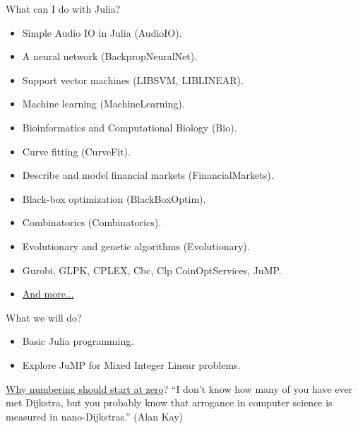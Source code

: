 \documentclass{beamer}
\begin{document}
\begin{frame}{What can I do with Julia?}
  \begin{itemize}\footnotesize
  \item[] Simple Audio IO in Julia (AudioIO).
  \item[] A neural network (BackpropNeuralNet).
  \item[] Support vector machines (LIBSVM, LIBLINEAR).
  \item[] Machine learning (MachineLearning).
  \item[] Bioinformatics and Computational Biology (Bio).
  \item[] Curve fitting (CurveFit).
  \item[] Describe and model financial markets (FinancialMarkets).
  \item[] Black-box optimization (BlackBoxOptim).
  \item[] Combinatorics (Combinatorics).
  \item[] Evolutionary and genetic algorithms (Evolutionary).
  \item[] Gurobi, GLPK, CPLEX, Cbc, Clp CoinOptServices, JuMP.
  \item[] \href{http://pkg.julialang.org/}{And more...}
  \end{itemize}
\end{frame}

\begin{frame}{What we will do?}
  \begin{itemize}
  \item[] Basic Julia programming.
  \item[] Explore JuMP for Mixed Integer Linear problems.
  \end{itemize}
\end{frame}

\begin{frame}
  \href{https://www.cs.utexas.edu/users/EWD/transcriptions/EWD08xx/EWD831.html}{Why numbering should start at zero}?
  ``I don't know how many of you have ever met Dijkstra, but you probably know that arrogance in computer science is measured in nano-Dijkstras.'' (Alan Kay)
\end{frame}
\end{document}
